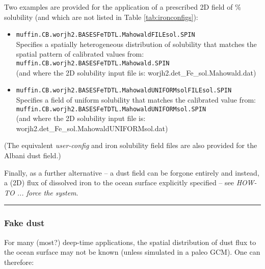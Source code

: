 \documentclass[11pt,fleqn]{book} %
\begin{document}
\vspace{1mm}
Two examples are provided for the application of a prescribed 2D field of \% solubility (and which are not listed in Table \ref{tab:ironconfigs}):
\begin{itemize}[noitemsep]
\vspace{1mm}
\item \texttt{muffin.CB.worjh2.BASESFeTDTL.MahowaldFILEsol.SPIN}
\\Specifies a spatially heterogeneous distribution of solubility that matches the  spatial pattern of calibrated values  from:
\\\texttt{\small muffin.CB.worjh2.BASESFeTDTL.Mahowald.SPIN}
\\(and where the 2D solubility input file is: \textsf{\footnotesize worjh2.det\_Fe\_sol.Mahowald.dat})
\vspace{1mm}
\item \texttt{muffin.CB.worjh2.BASESFeTDTL.MahowaldUNIFORMsolFILEsol.SPIN}
\\Specifies a field of uniform solubility that matches the calibrated value from:
\\\texttt{\small muffin.CB.worjh2.BASESFeTDTL.MahowaldUNIFORMsol.SPIN}
\\(and where the 2D solubility input file is: \textsf{\footnotesize worjh2.det\_Fe\_sol.MahowaldUNIFORMsol.dat})
\end{itemize}
\vspace{1mm}
(The equivalent \textit{user-config} and iron solubility field files are also provided for the Albani dust field.) 

\vspace{2mm}
\noindent Finally, as a further alternative -- a dust field can be forgone entirely and instead, a (2D) flux of dissolved iron to the ocean surface explicitly specified -- see \textit{HOW-TO ... force the system}.

%
\noindent\rule{4cm}{0.5pt}
\subsubsection{Fake dust}
\vspace{1mm}

For many (most?) deep-time applications, the spatial distribution of dust flux to the ocean surface may not be known (unless simulated in a paleo GCM). One can therefore:
\end{document}

